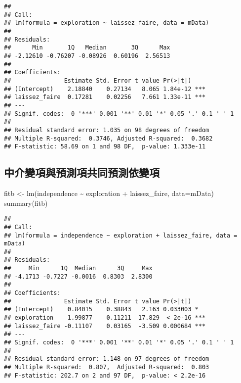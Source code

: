 \documentclass[
]{book}
\newenvironment{Shaded}{\begin{snugshade}}{\end{snugshade}}
\newcommand{\AttributeTok}[1]{\textcolor[rgb]{0.77,0.63,0.00}{#1}}
\newcommand{\FunctionTok}[1]{\textcolor[rgb]{0.00,0.00,0.00}{#1}}
\newcommand{\NormalTok}[1]{#1}
\newcommand{\OtherTok}[1]{\textcolor[rgb]{0.56,0.35,0.01}{#1}}
\newcommand{\SpecialCharTok}[1]{\textcolor[rgb]{0.00,0.00,0.00}{#1}}
\begin{document}
\begin{verbatim}
## 
## Call:
## lm(formula = exploration ~ laissez_faire, data = mData)
## 
## Residuals:
##      Min       1Q   Median       3Q      Max 
## -2.12610 -0.76207 -0.08926  0.60196  2.56513 
## 
## Coefficients:
##               Estimate Std. Error t value Pr(>|t|)    
## (Intercept)    2.18840    0.27134   8.065 1.84e-12 ***
## laissez_faire  0.17281    0.02256   7.661 1.33e-11 ***
## ---
## Signif. codes:  0 '***' 0.001 '**' 0.01 '*' 0.05 '.' 0.1 ' ' 1
## 
## Residual standard error: 1.035 on 98 degrees of freedom
## Multiple R-squared:  0.3746, Adjusted R-squared:  0.3682 
## F-statistic: 58.69 on 1 and 98 DF,  p-value: 1.333e-11
\end{verbatim}

\hypertarget{ux4e2dux4ecbux8b8aux9805ux8207ux9810ux6e2cux9805ux5171ux540cux9810ux6e2cux4f9dux8b8aux9805}{%
\subsection{中介變項與預測項共同預測依變項}\label{ux4e2dux4ecbux8b8aux9805ux8207ux9810ux6e2cux9805ux5171ux540cux9810ux6e2cux4f9dux8b8aux9805}}

\begin{Shaded}
\begin{Highlighting}[]
\NormalTok{fitb }\OtherTok{\textless{}{-}} \FunctionTok{lm}\NormalTok{(independence }\SpecialCharTok{\textasciitilde{}}\NormalTok{ exploration }\SpecialCharTok{+}\NormalTok{ laissez\_faire, }\AttributeTok{data=}\NormalTok{mData)}
\FunctionTok{summary}\NormalTok{(fitb)}
\end{Highlighting}
\end{Shaded}

\begin{verbatim}
## 
## Call:
## lm(formula = independence ~ exploration + laissez_faire, data = mData)
## 
## Residuals:
##     Min      1Q  Median      3Q     Max 
## -4.1713 -0.7227 -0.0016  0.8303  2.8300 
## 
## Coefficients:
##               Estimate Std. Error t value Pr(>|t|)    
## (Intercept)    0.84015    0.38843   2.163 0.033003 *  
## exploration    1.99877    0.11211  17.829  < 2e-16 ***
## laissez_faire -0.11107    0.03165  -3.509 0.000684 ***
## ---
## Signif. codes:  0 '***' 0.001 '**' 0.01 '*' 0.05 '.' 0.1 ' ' 1
## 
## Residual standard error: 1.148 on 97 degrees of freedom
## Multiple R-squared:  0.807,  Adjusted R-squared:  0.803 
## F-statistic: 202.7 on 2 and 97 DF,  p-value: < 2.2e-16
\end{verbatim}
\end{document}
